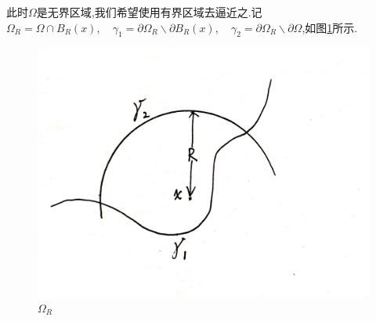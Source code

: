 \documentclass[12pt, a4paper]{article}
\begin{document}
	此时$\Omega$是无界区域,我们希望使用有界区域去逼近之.记$\Omega_R=\Omega \cap B_R(x) ,\quad \gamma_1= \partial\Omega_R \backslash \partial B_R(x) ,\quad \gamma_2= \partial\Omega_R \backslash \partial \Omega $,如图\ref{pde1_4_6}所示.
	\begin{figure}[htbp]
		\centering
		\includegraphics[scale=0.05]{PDE1_4_6.jpg}
        \caption{$\Omega_R$}
        \label{pde1_4_6}
	\end{figure}
	
\end{document}
